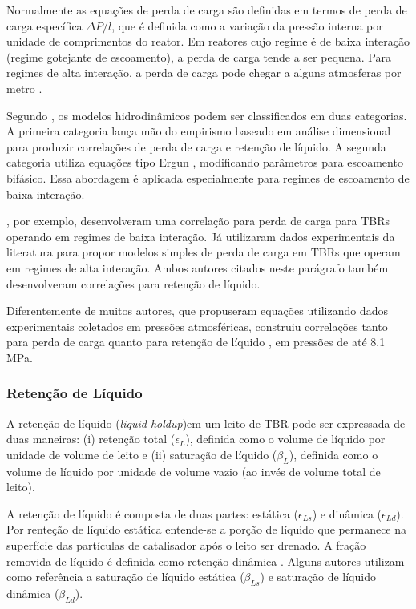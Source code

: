 Normalmente as equações de perda de carga são definidas em termos de perda de
carga específica $\Delta P/l$, que é definida como a variação da pressão interna
por unidade de comprimentos do reator. Em reatores cujo regime é de baixa
interação (regime gotejante de escoamento), a perda de carga tende a ser
pequena. Para regimes de alta interação, a perda de carga pode chegar a alguns
atmosferas por metro \cite{Benkrid1997}.


Segundo , os modelos hidrodinâmicos podem ser
classificados em duas categorias. A primeira categoria lança mão do empirismo
baseado em análise dimensional para produzir correlações de perda de carga e
retenção de líquido. A segunda categoria utiliza equações tipo Ergun
, modificando parâmetros para escoamento bifásico.
Essa abordagem é aplicada especialmente para regimes de escoamento de baixa
interação.

, por exemplo, desenvolveram uma correlação para perda
de carga para TBRs operando em regimes de baixa interação. Já
 utilizaram dados experimentais  da literatura para propor modelos
simples de perda de carga em TBRs que operam em regimes de alta
interação. Ambos autores citados neste parágrafo também desenvolveram
correlações para retenção de líquido.

Diferentemente de muitos autores, que propuseram equações utilizando dados
experimentais coletados em pressões atmosféricas, 
construiu correlações tanto para perda de carga quanto para retenção de líquido
, em pressões de até 8.1 MPa.

\subsubsection{Retenção de Líquido}
\label{sec:retencaodeliquido}

A retenção de líquido (\emph{liquid holdup})em um leito de TBR  pode ser
expressada de duas maneiras: (i) retenção total ($\epsilon_L$), definida
como o volume de líquido por unidade de volume de leito e (ii) saturação de líquido
($\beta_L$), definida como o volume de líquido por unidade de volume vazio
(ao invés de volume total de leito). 

A retenção de líquido é composta de duas partes: estática ($\epsilon_{Ls}$) e
dinâmica ($\epsilon_{Ld}$). Por renteção de líquido estática entende-se a porção
de líquido que permanece na superfície das partículas de catalisador após o
leito ser drenado. A fração removida de líquido é definida como retenção
dinâmica \cite{Ranade2011}. Alguns autores utilizam como referência a saturação
de líquido estática ($\beta_{Ls}$) e saturação de líquido dinâmica ($\beta_{Ld}$).

